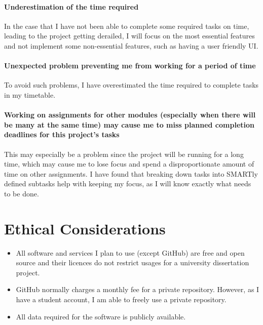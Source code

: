 \documentclass{article}
\begin{document}
	\paragraph{Underestimation of the time required} In the case that I have not been able to complete some required tasks on time, leading to the project getting derailed, I will focus on the most essential features and not implement some non-essential features, such as having a user friendly UI.
	\paragraph{Unexpected problem preventing me from working for a period of time} To avoid such problems, I have overestimated the time required to complete tasks in my timetable.
	\paragraph{Working on assignments for other modules (especially when there will be many at the same time) may cause me to miss planned completion deadlines for this project's tasks} This may especially be a problem since the project will be running for a long time, which may cause me to lose focus and spend a disproportionate amount of time on other assignments. I have found that breaking down tasks into SMARTly defined subtasks help with keeping my focus, as I will know exactly what needs to be done.
	
	
	
	\section{Ethical Considerations}
	\begin{itemize}
		\item All software and services I plan to use (except GitHub) are free and open source and their licences do not restrict usages for a university dissertation project.
		\item GitHub normally charges a monthly fee for a private repository. However, as I have a student account, I am able to freely use a private repository.
		\item All data required for the software is publicly available.
	\end{itemize}
	
	
	
\end{document}
